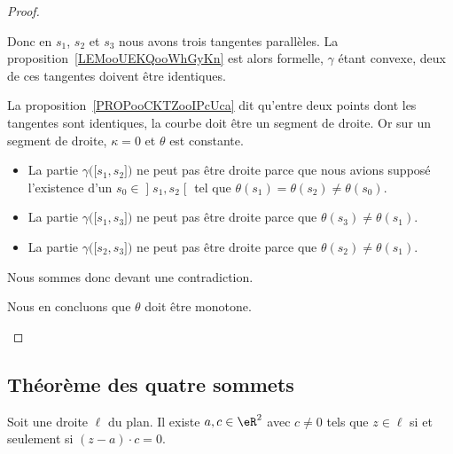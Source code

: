 \begin{proof}
\begin{subproof}
		Donc en \( s_1\), \( s_2\) et \( s_3\) nous avons trois tangentes parallèles. La proposition~\ref{LEMooUEKQooWhGyKn} est alors formelle, \( \gamma\) étant convexe, deux de ces tangentes doivent être identiques.

		La proposition~\ref{PROPooCKTZooIPcUca} dit qu'entre deux points dont les tangentes sont identiques, la courbe doit être un segment de droite. Or sur un segment de droite, \( \kappa=0\) et \( \theta\) est constante.

		\begin{itemize}
			\item
			      La partie \( \gamma\big( \mathopen[ s_1 , s_2 \mathclose] \big)\) ne peut pas être droite parce que nous avions supposé l'existence d'un \( s_0\in \mathopen] s_1 , s_2 \mathclose[\) tel que \( \theta(s_1)=\theta(s_2)\neq \theta(s_0)\).

			\item
			      La partie \( \gamma\big( \mathopen[ s_1 , s_3 \mathclose] \big)\) ne peut pas être droite parce que \( \theta(s_3)\neq \theta(s_1)\).
			\item
			      La partie \( \gamma\big( \mathopen[ s_2 , s_3 \mathclose] \big)\) ne peut pas être droite parce que \( \theta(s_2)\neq \theta(s_1)\).
		\end{itemize}
		Nous sommes donc devant une contradiction.

		Nous en concluons que \( \theta\) doit être monotone.
	\end{subproof}
\end{proof}

\subsection{Théorème des quatre sommets}

\begin{lemma}       \label{LEMooELIRooNDVXPh}
	Soit une droite \( \ell\) du plan. Il existe \( a,c\in \eR^2\) avec \( c\neq 0\) tels que \( z\in \ell\) si et seulement si \( (z-a)\cdot c=0\).
\end{lemma}

